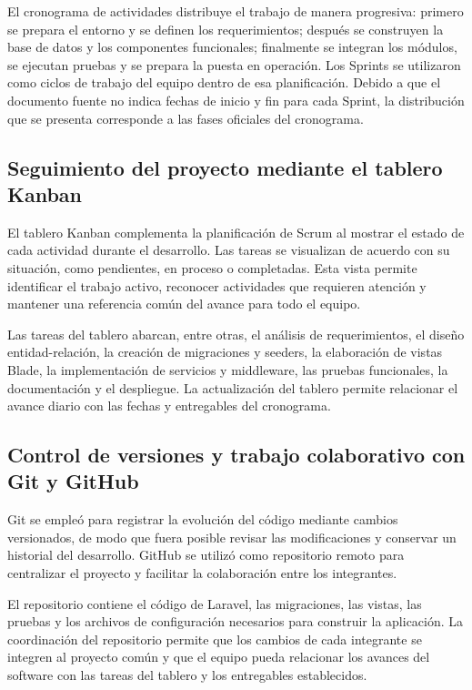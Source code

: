 El cronograma de actividades distribuye el trabajo de manera progresiva: primero se prepara el entorno y se definen los requerimientos; después se construyen la base de datos y los componentes funcionales; finalmente se integran los módulos, se ejecutan pruebas y se prepara la puesta en operación. Los Sprints se utilizaron como ciclos de trabajo del equipo dentro de esa planificación. Debido a que el documento fuente no indica fechas de inicio y fin para cada Sprint, la distribución que se presenta corresponde a las fases oficiales del cronograma.

\subsection{Seguimiento del proyecto mediante el tablero Kanban}

El tablero Kanban complementa la planificación de Scrum al mostrar el estado de cada actividad durante el desarrollo. Las tareas se visualizan de acuerdo con su situación, como pendientes, en proceso o completadas. Esta vista permite identificar el trabajo activo, reconocer actividades que requieren atención y mantener una referencia común del avance para todo el equipo.

Las tareas del tablero abarcan, entre otras, el análisis de requerimientos, el diseño entidad-relación, la creación de migraciones y seeders, la elaboración de vistas Blade, la implementación de servicios y middleware, las pruebas funcionales, la documentación y el despliegue. La actualización del tablero permite relacionar el avance diario con las fechas y entregables del cronograma.

\subsection{Control de versiones y trabajo colaborativo con Git y GitHub}

Git se empleó para registrar la evolución del código mediante cambios versionados, de modo que fuera posible revisar las modificaciones y conservar un historial del desarrollo. GitHub se utilizó como repositorio remoto para centralizar el proyecto y facilitar la colaboración entre los integrantes.

El repositorio contiene el código de Laravel, las migraciones, las vistas, las pruebas y los archivos de configuración necesarios para construir la aplicación. La coordinación del repositorio permite que los cambios de cada integrante se integren al proyecto común y que el equipo pueda relacionar los avances del software con las tareas del tablero y los entregables establecidos.

